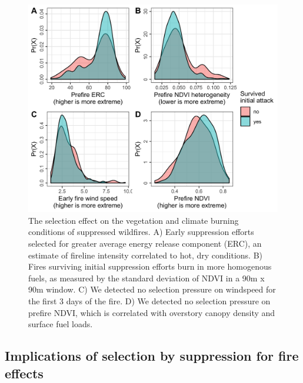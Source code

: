 \documentclass[twoside,12pt,final]{ucthesis-CA2012}
\begin{document}
\begin{ucmainmatter}
\begin{figure}
\includegraphics[width=6.00000in]{figure/chap03/selection-on-burning-conditions.png}
\caption{The selection effect on the vegetation and climate burning
conditions of suppressed wildfires. A) Early suppression efforts
selected for greater average energy release component (ERC), an estimate
of fireline intensity correlated to hot, dry conditions. B) Fires
surviving initial suppression efforts burn in more homogenous fuels, as
measured by the standard deviation of NDVI in a 90m x 90m window. C) We
detected no selection pressure on windspeed for the first 3 days of the
fire. D) We detected no selection pressure on prefire NDVI, which is
correlated with overstory canopy density and surface fuel loads.}
\end{figure}
\subsection{Implications of selection by suppression for fire
effects}\label{implications-of-selection-by-suppression-for-fire-effects}


\end{ucmainmatter}
\end{document}
